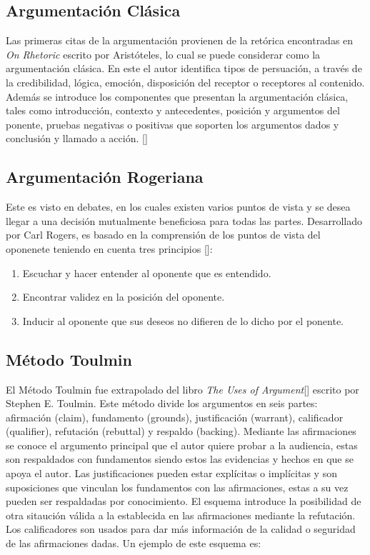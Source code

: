 \subsection{Argumentación Clásica}

Las primeras citas de la argumentación provienen de la retórica encontradas en \emph{On Rhetoric} 
escrito por Aristóteles, lo cual se puede considerar como la argumentación clásica. 
En este el autor identifica tipos de persuación, a través de la credibilidad, lógica, 
emoción, disposición del receptor o receptores al contenido.
Además se introduce los componentes que presentan la argumentación clásica, tales como
introducción, contexto y antecedentes, posición y argumentos del ponente, pruebas negativas o positivas
que soporten los argumentos dados y conclusión y llamado a acción. [\cite{classicalArgument}] 

\subsection{Argumentación Rogeriana}

Este es visto en debates, en los cuales existen varios puntos de vista y se desea llegar a una 
decisión mutualmente beneficiosa para todas las partes. Desarrollado por Carl Rogers, es basado en 
la comprensión de los puntos de vista del oponenete teniendo en cuenta tres principios 
[\cite{rogerianArgument}]:

\begin{enumerate}
    \item Escuchar y hacer entender al oponente que es entendido.
    \item Encontrar validez en la posición del oponente.
    \item Inducir al oponente que sus deseos no difieren de lo dicho por el ponente.
\end{enumerate}

\subsection{Método Toulmin}

El Método Toulmin fue extrapolado del libro \emph{The Uses of Argument}[\cite{toulmin_2003}] escrito por Stephen E. Toulmin.
Este método divide los argumentos en seis partes: afirmación (claim), fundamento (grounds), 
justificación (warrant), calificador (qualifier), refutación (rebuttal) y respaldo (backing).
Mediante las afirmaciones se conoce el argumento principal que el autor quiere probar a la audiencia,
estas son respaldados con fundamentos siendo estos las evidencias y hechos en que se apoya el autor.
Las justificaciones pueden estar explícitas o implícitas y son suposiciones que vinculan los
fundamentos con las afirmaciones, estas a su vez pueden ser respaldadas por conocimiento.
El esquema introduce la posibilidad de otra sitaución válida a la establecida en las afirmaciones
mediante la refutación. Los calificadores son usados para dar más información de la calidad o seguridad
de las afirmaciones dadas. Un ejemplo de este esquema es:

